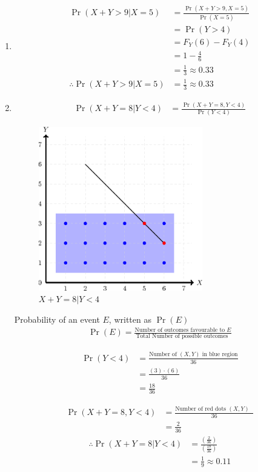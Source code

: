 \documentclass[journal,12pt,twocolumn]{IEEEtran}
\providecommand{\pr}[1]{\ensuremath{\Pr\left(#1\right)}}
\providecommand{\brak}[1]{\ensuremath{\left(#1\right)}}
\theoremstyle{remark}
\begin{document}
\begin{enumerate}[label=(\alph*)]
    \item
    \begin{align}
        \pr{X+Y> 9 | X = 5} &= \frac{\pr{X+Y> 9, X = 5}}{\pr{X = 5}}\\
                          &= \pr{Y > 4}\\
                          &= F_{Y}(6) -F_{Y}(4)\\
                          &= 1 - \frac{4}{6}\\
                          &= \frac{1}{3} \approx 0.33\\
                          \therefore \pr{X+Y> 9 | X = 5} &= \frac{1}{3}\approx 0.33
    \end{align}
\item

\begin{align}
\pr{X+Y = 8 | Y < 4} &= \frac{\pr{X+Y = 8, Y < 4}}{\pr{Y < 4}}
\end{align}

\begin{figure}[h!]
  \centering \includegraphics[width= 7.15cm]{figs/figure}
  \caption{$X+Y = 8 | Y < 4$}
  \label{fig:1}
\end{figure}



Probability of an event $E$, written as $\pr{E}$
\begin{align}
\pr{E}=\frac{\text{Number of outcomes favourable to $E$}}{\text{Total Number of possible outcomes }}
\end{align}

\begin{align}
    \pr{Y < 4} &= \frac{\text{Number of $(X,Y)$ in blue region}}{36}\\
    &= \frac{\brak{3}\cdot\brak{6}}{36}\\
    &= \frac{18}{36}
\end{align}

\begin{align}
    \pr{X+Y = 8, Y<4} &= \frac{\text{Number of red dots $(X,Y)$ }}{36}\\
         &=\frac{2}{36} 
    \end{align}
    \begin{align}
    \therefore \pr{X+Y = 8 | Y < 4} &= \frac{\brak{\frac{2}{36}}}{\brak{\frac{18}{36}}}\\
    &=\frac{1}{9} \approx 0.11
\end{align}


\end{enumerate}
\end{document}

